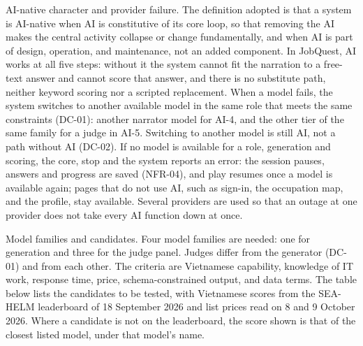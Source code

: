 AI-native character and provider failure. The definition adopted is that a system is AI-native when AI is constitutive of its core loop, so that removing the AI makes the central activity collapse or change fundamentally\cite{r132}, and when AI is part of design, operation, and maintenance, not an added component\cite{r133}. In JobQuest, AI works at all five steps: without it the system cannot fit the narration to a free-text answer and cannot score that answer, and there is no substitute path, neither keyword scoring nor a scripted replacement. When a model fails, the system switches to another available model in the same role that meets the same constraints (DC-01): another narrator model for AI-4, and the other tier of the same family for a judge in AI-5. Switching to another model is still AI, not a path without AI (DC-02). If no model is available for a role, generation and scoring, the core, stop and the system reports an error: the session pauses, answers and progress are saved (NFR-04), and play resumes once a model is available again; pages that do not use AI, such as sign-in, the occupation map, and the profile, stay available. Several providers are used so that an outage at one provider does not take every AI function down at once.

Model families and candidates. Four model families are needed: one for generation and three for the judge panel. Judges differ from the generator (DC-01) and from each other. The criteria are Vietnamese capability, knowledge of IT work, response time, price, schema-constrained output, and data terms. The table below lists the candidates to be tested, with Vietnamese scores from the SEA-HELM leaderboard of 18 September 2026\cite{r134} and list prices read on 8 and 9 October 2026\cite{r135}. Where a candidate is not on the leaderboard, the score shown is that of the closest listed model, under that model's name.

